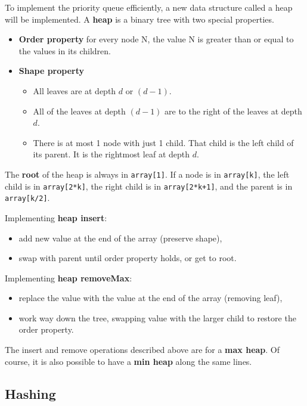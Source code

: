 To implement the priority queue efficiently, a new data structure called a heap will be implemented. A \textbf{heap} is a binary tree with two special properties.

\begin{itemize}
	\item \textbf{Order property} for every node N, the value N is greater than or equal to the values in its children. 
	\item \textbf{Shape property} 
	\begin{itemize}
		\item All leaves are at depth $d$ or $(d-1)$.
		\item All of the leaves at depth $(d-1)$ are to the right of the leaves at depth $d$.
		\item There is at most 1 node with just 1 child. That child is the left child of its parent. It is the rightmost leaf at depth $d$. 
	\end{itemize}
\end{itemize}

The \textbf{root} of the heap is always in \texttt{array[1]}. If a node is in \texttt{array[k]}, the left child is in \texttt{array[2*k]}, the right child is in \texttt{array[2*k+1]}, and the parent is in \texttt{array[k/2]}.

Implementing \textbf{heap insert}:
\begin{itemize}
	\item add new value at the end of the array (preserve shape),
	\item swap with parent until order property holds, or get to root.
\end{itemize}

Implementing \textbf{heap removeMax}:
\begin{itemize}
	\item replace the value with the value at the end of the array (removing leaf), 
	\item work way down the tree, swapping value with the larger child to restore the order property.
\end{itemize}

The insert and remove operations described above are for a \textbf{max heap}. Of course, it is also possible to have a \textbf{min heap} along the same lines. 

\subsection{Hashing}

